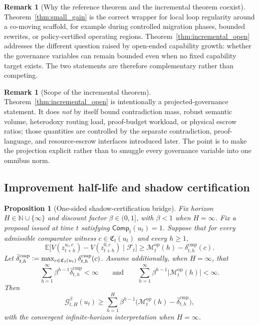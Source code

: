\documentclass[11pt]{article}
\newtheorem{proposition}[theorem]{Proposition}
\theoremstyle{definition}
\newtheorem{remark}[theorem]{Remark}
\newcommand{\N}{\mathbb{N}}
\newcommand{\E}{\mathbb{E}}
\newcommand{\1}{\mathbf{1}}
\newcommand{\Defeq}{\vcentcolon=}
\begin{document}
\begin{remark}[Why the reference theorem and the incremental theorem coexist]
Theorem~\ref{thm:small_gain} is the correct wrapper for local loop regularity around a co-moving scaffold, for example during controlled migration phases, bounded rewrites, or policy-certified operating regions. Theorem~\ref{thm:incremental_open} addresses the different question raised by open-ended capability growth: whether the governance variables can remain bounded even when no fixed capability target exists. The two statements are therefore complementary rather than competing.
\end{remark}
\begin{remark}[Scope of the incremental theorem]\label{rem:incremental_scope}
Theorem~\ref{thm:incremental_open} is intentionally a projected-governance statement. It does \emph{not} by itself bound contradiction mass, robust semantic volume, heterodoxy routing load, proof-budget workload, or physical escrow ratios; those quantities are controlled by the separate contradiction, proof-language, and resource-escrow interfaces introduced later. The point is to make the projection explicit rather than to smuggle every governance variable into one omnibus norm.
\end{remark}
\subsection{Improvement half-life and shadow certification}
\begin{proposition}[One-sided shadow-certification bridge]\label{prop:shadow_bridge}
Fix horizon $H\in\N\cup\{\infty\}$ and discount factor $\beta\in(0,1]$, with $\beta<1$ when $H=\infty$. Fix a proposal issued at time $t$ satisfying $\mathsf{Comp}_t(u_t)=1$. Suppose that for every admissible comparator witness $c\in\mathfrak C_t(u_t)$ and every $h\ge1$,
\[
\E\bigl[V(z_{t+h}^{u_t,c})-V(z_{t+h}^{0,c})\mid \mathcal F_t\bigr]
\ge
\mathcal M_t^{\mathrm{op}}(h)-\delta_{t,h}^{\mathrm{cmp}}(c).
\]
Let $\bar\delta_{t,h}^{\mathrm{cmp}}\Defeq \max_{c\in\mathfrak C_t(u_t)}\delta_{t,h}^{\mathrm{cmp}}(c)$. Assume additionally, when $H=\infty$, that
\[
\sum_{h=1}^{\infty}\beta^{h-1}\bar\delta_{t,h}^{\mathrm{cmp}}<\infty
\qquad\text{and}\qquad
\sum_{h=1}^{\infty}\beta^{h-1}\bigl|\mathcal M_t^{\mathrm{op}}(h)\bigr|<\infty.
\]
Then
\[
\mathcal G_{t,H}^{\beta}(u_t)
\ge
\sum_{h=1}^{H}\beta^{h-1}\bigl(\mathcal M_t^{\mathrm{op}}(h)-\bar\delta_{t,h}^{\mathrm{cmp}}\bigr),
\]
with the convergent infinite-horizon interpretation when $H=\infty$.
\end{proposition}
\end{document}
